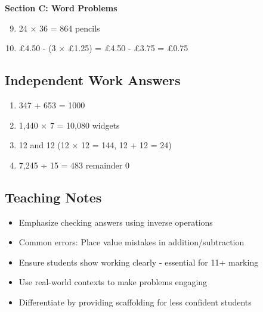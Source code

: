 \documentclass{article}
\begin{document}
\textbf{Section C: Word Problems}
\begin{enumerate}
    \setcounter{enumi}{8}
    \item 24 × 36 = 864 pencils
    \item £4.50 - (3 × £1.25) = £4.50 - £3.75 = £0.75
\end{enumerate}

\subsection*{Independent Work Answers}
\begin{enumerate}
    \item 347 + 653 = 1000
    \item 1,440 × 7 = 10,080 widgets
    \item 12 and 12 (12 × 12 = 144, 12 + 12 = 24)
    \item 7,245 ÷ 15 = 483 remainder 0
\end{enumerate}

\subsection*{Teaching Notes}
\begin{itemize}
    \item Emphasize checking answers using inverse operations
    \item Common errors: Place value mistakes in addition/subtraction
    \item Ensure students show working clearly - essential for 11+ marking
    \item Use real-world contexts to make problems engaging
    \item Differentiate by providing scaffolding for less confident students
\end{itemize}
\end{document}
